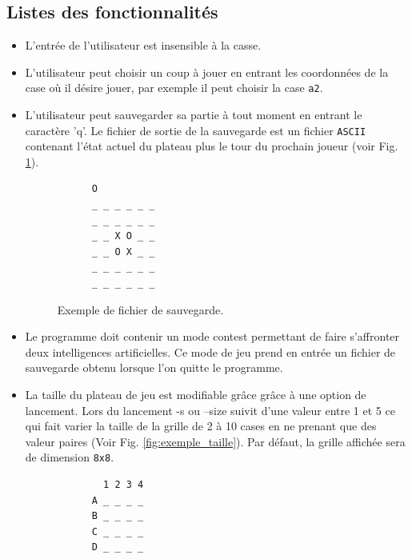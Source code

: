 \documentclass[10pt,a4paper]{article}
\begin{document}
\subsection{Listes des fonctionnalités}
\label{sec:fonctionnalites}

\begin {itemize}
\item  L'entrée de l'utilisateur est insensible à la casse.
\item  L'utilisateur peut choisir un coup à jouer en entrant les coordonnées de la case où il désire jouer, par exemple il peut choisir la case \verb!a2!.
\item  L'utilisateur peut sauvegarder sa partie à tout moment en entrant le caractère 'q'. Le fichier de sortie de la sauvegarde est un fichier \verb!ASCII! contenant l'état actuel du plateau plus le tour du prochain joueur (voir Fig. \ref{fig:exemple_save}).
  \begin{figure}[H]    
    \centering
    \begin{BVerbatim}
      O
      _ _ _ _ _ _
      _ _ _ _ _ _
      _ _ X O _ _
      _ _ O X _ _
      _ _ _ _ _ _
      _ _ _ _ _ _ 
    \end{BVerbatim}
    \caption {Exemple de fichier de sauvegarde.\label{fig:exemple_save}}
    \end{figure}

\item  Le programme doit contenir un mode contest permettant de faire s'affronter deux intelligences artificielles. Ce mode de jeu prend en entrée un fichier de sauvegarde obtenu lorsque l'on quitte le programme.
\item  La taille du plateau de jeu est modifiable grâce grâce à une option de lancement. Lors du lancement -s ou --size suivit d'une valeur entre 1 et 5 ce qui fait varier la taille de la grille de 2 à 10 cases en ne prenant que des valeur paires (Voir Fig. \ref{fig:exemple_taille}). Par défaut, la grille affichée sera de dimension \verb!8x8!.
  \begin{figure}[H]    
    \centering
    \begin{BVerbatim}
        1 2 3 4 
      A _ _ _ _
      B _ _ _ _
      C _ _ _ _
      D _ _ _ _
      

\end{BVerbatim}
\end{figure}
\end{itemize}
\end{document}
